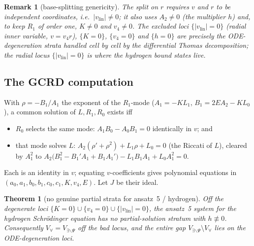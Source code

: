 \documentclass[11pt]{article}
\newcommand{\Vall}{V_{\forall}}
\newcommand{\Vex}{V_{\exists\backslash\Psi}}
\newcommand{\vlin}{v_{\mathrm{lin}}}
\newtheorem{theorem}{Theorem}
\newtheorem{remark}{Remark}
\begin{document}
\begin{remark}[base-splitting genericity]
\label{rem:generic}
The split on $r$ requires $v$ and $r$ to be independent coordinates, i.e.\
$|\vlin|\neq0$; it also uses $A_2\ne0$ (the multiplier $h$) and, to keep $R_1$
of order one, $K\neq0$ and $v_4\neq0$. The excluded loci $\{|\vlin|=0\}$
(radial inner variable, $v=v_4r$), $\{K=0\}$, $\{v_4=0\}$ and $\{h=0\}$ are
precisely the ODE-degeneration strata handled cell by cell by the differential
Thomas decomposition; the radial locus $\{|\vlin|=0\}$ is where the hydrogen
bound states live.
\end{remark}

\subsection{The GCRD computation}

With $\rho=-B_1/A_1$ the exponent of the $R_1$-mode ($A_1=-KL_1$,
$B_1=2EA_2-KL_0$), a common solution of $L,R_1,R_0$ exists iff
\begin{itemize}
\item[(P)] $R_0$ selects the same mode: $A_1B_0-A_0B_1=0$ identically in $v$; and
\item[(R)] that mode solves $L$: $A_2(\rho'+\rho^2)+L_1\rho+L_0=0$ (the Riccati
of $L$), cleared by $A_1^2$ to
$A_2\big(B_1^2-B_1'A_1+B_1A_1'\big)-L_1B_1A_1+L_0A_1^2=0$.
\end{itemize}
Each is an identity in $v$; equating $v$-coefficients gives polynomial equations
in $(a_0,a_1,b_0,b_1,c_0,c_1,K,v_4,E)$. Let $J$ be their ideal.

\begin{theorem}[no genuine partial strata for ansatz~5 / hydrogen]
\label{thm:ansatz5}
Off the degenerate loci $\{K=0\}\cup\{v_4=0\}\cup\{|\vlin|=0\}$, the ansatz~5
system for the hydrogen Schr\"odinger equation has no partial-solution stratum
with $h\not\equiv 0$. Consequently $\Vall=\Vex$ off the bad locus, and the
entire gap $\Vex\setminus\Vall$ lies on the ODE-degeneration loci.
\end{theorem}
\end{document}
